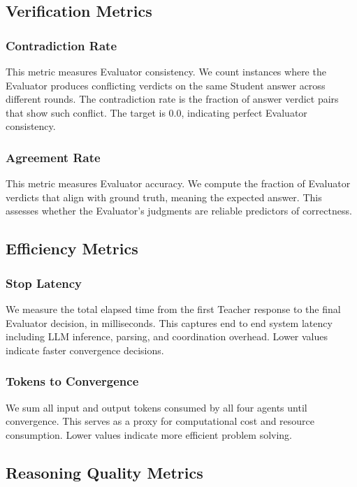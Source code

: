 \documentclass[conference]{IEEEtran}
\begin{document}
\subsection{Verification Metrics}

\subsubsection{Contradiction Rate}
This metric measures Evaluator consistency. We count instances where the Evaluator produces conflicting verdicts on the same Student answer across different rounds. The contradiction rate is the fraction of answer verdict pairs that show such conflict. The target is 0.0, indicating perfect Evaluator consistency.

\subsubsection{Agreement Rate}
This metric measures Evaluator accuracy. We compute the fraction of Evaluator verdicts that align with ground truth, meaning the expected answer. This assesses whether the Evaluator's judgments are reliable predictors of correctness.

\subsection{Efficiency Metrics}

\subsubsection{Stop Latency}
We measure the total elapsed time from the first Teacher response to the final Evaluator decision, in milliseconds. This captures end to end system latency including LLM inference, parsing, and coordination overhead. Lower values indicate faster convergence decisions.

\subsubsection{Tokens to Convergence}
We sum all input and output tokens consumed by all four agents until convergence. This serves as a proxy for computational cost and resource consumption. Lower values indicate more efficient problem solving.

\subsection{Reasoning Quality Metrics}
\end{document}

